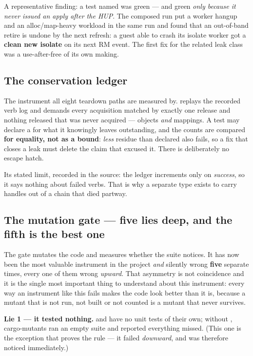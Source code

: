 \documentclass[10.5pt]{article}
\begin{document}
A representative finding: a test named
 was green — and green
\emph{only because it never issued an apply after the HUP}. The composed run put a worker hangup
and an alloc/map-heavy workload in the same run and found that an out-of-band retire is undone by
the next refresh: a guest able to crash its isolate worker got a \textbf{clean new isolate} on its
next RM event. The first fix for the related leak class was a use-after-free of its own making.

\subsection{The conservation ledger}

The instrument all eight teardown paths are measured by.  replays the recorded
verb log and demands every acquisition matched by exactly one release and nothing released that
was never acquired — objects \emph{and} mappings. A test may declare a  for
what it knowingly leaves outstanding, and the counts are compared \textbf{for equality, not as a
bound}: \emph{less} residue than declared also fails, so a fix that closes a leak must delete the
claim that excused it. There is deliberately no  escape hatch.

Its stated limit, recorded in the source: the ledger increments only on \emph{success}, so it
says nothing about failed verbs. That is why a separate  type
exists to carry handles out of a chain that died partway.

\subsection{The mutation gate --- \texorpdfstring{\textbf{five}}{five} lies deep, and the fifth is the best one}
\label{sec:mutgate}

The gate mutates the code and measures whether the suite notices. It has now been the most
valuable instrument in the project \emph{and} silently wrong \textbf{five} separate times, every
one of them wrong \emph{upward}. That asymmetry is not coincidence and it is the single most
important thing to understand about this instrument: every way an instrument like this fails
makes the code look better than it is, because a mutant that is not run, not built or not counted
is a mutant that never survives.

\textbf{Lie 1 — it tested nothing.}  and  have no unit tests
of their own; without , cargo-mutants ran an empty suite and reported
everything missed. (This one is the exception that proves the rule — it failed \emph{downward},
and was therefore noticed immediately.)
\end{document}
